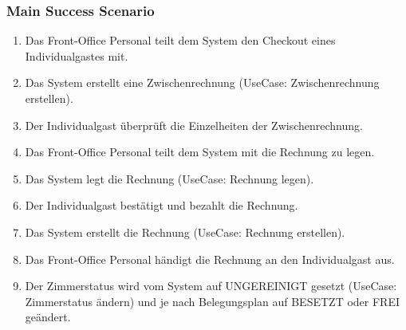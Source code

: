 \documentclass[./detailed_overview_usecases.tex]{subfiles}
\begin{document}
    \subsubsection*{Main Success Scenario}
    \begin{enumerate}
        \item Das Front-Office Personal teilt dem System den Checkout eines Individualgastes mit.
        \item Das System erstellt eine Zwischenrechnung (UseCase: Zwischenrechnung erstellen).
        \item Der Individualgast überprüft die Einzelheiten der Zwischenrechnung.
        \item Das Front-Office Personal teilt dem System mit die Rechnung zu legen.
        \item Das System legt die Rechnung (UseCase: Rechnung legen).
        \item Der Individualgast bestätigt und bezahlt die Rechnung.
        \item Das System erstellt die Rechnung (UseCase: Rechnung erstellen).
        \item Das Front-Office Personal händigt die Rechnung an den Individualgast aus.
        \item Der Zimmerstatus wird vom System auf UNGEREINIGT gesetzt (UseCase: Zimmerstatus ändern) und je nach
        Belegungsplan auf BESETZT oder FREI geändert.
    \end{enumerate}
\end{document}

